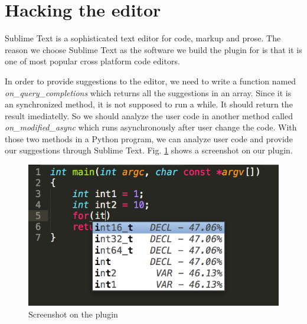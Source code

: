 \documentclass[prodmode,acmtecs]{acmsmall} %
\begin{document}
\begin{table}%
\end{table}%




\section{Hacking the editor}

Sublime Text is a sophisticated text editor for code, markup and prose\cite{skinner2016sublime}. The reason we choose Sublime Text as the software we build the plugin for is that it is one of most popular cross platform code editors. 

In order to provide suggestions to the editor, we need to write a function named {\it on\_query\_completions} which returns all the suggestions in an array. Since it is an synchronized method, it is not supposed to run a while. It should return the result imediatelly. So we should analyze the user code in another method called {\it on\_modified\_async} which runs asynchronously after user change the code. With those two methods in a Python program, we can analyze user code and provide our suggestions through Sublime Text. Fig. \ref{fig:sublimeplugin} shows a screenshot on our plugin.

\begin{figure}
\centerline{\includegraphics[width=1.0\textwidth]{sublimeplugin}}
\caption{Screenshot on the plugin}
\label{fig:sublimeplugin}
\end{figure}




 
\end{document}
